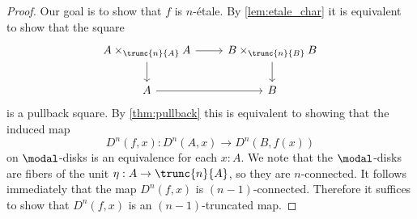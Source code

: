 \documentclass{msc}
\begin{document}
\begin{proof}
  Our goal is to show that $f$ is $n$-\'etale. By \cref{lem:etale_char} it is equivalent to show that the square
  \begin{equation*}
    \begin{tikzcd}
      A\times_{\trunc{n}{A}} A \arrow[r] \arrow[d] & B \times_{\trunc{n}{B}} B \arrow[d] \\
      A \arrow[r] & B
    \end{tikzcd}
  \end{equation*}
  is a pullback square. By \cref{thm:pullback} this is equivalent to showing that the induced map
  \begin{equation*}
    D^{n}(f,x):D^{n}(A,x)\to D^{n}(B,f(x))
  \end{equation*}
  on $\modal$-disks is an equivalence for each $x:A$. We note that the $\modal$-disks are fibers of the unit $\eta:A \to \trunc{n}{A}$, so they are $n$-connected. It follows immediately that the map $D^{n}(f,x)$ is $(n-1)$-connected. Therefore it suffices to show that $D^{n}(f,x)$ is an $(n-1)$-truncated map.


\end{proof}
\end{document}
